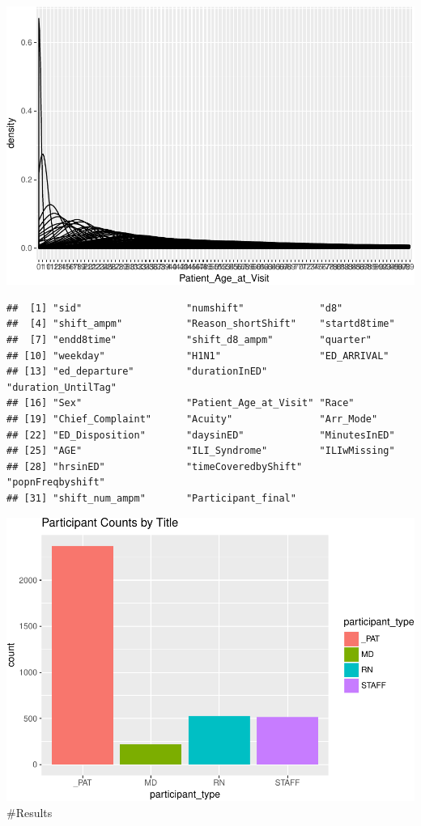 \documentclass[]{elsarticle} %
\makeatletter
\def\maxwidth{\ifdim\Gin@nat@width>\linewidth\linewidth
\else\Gin@nat@width\fi}
\let\Oldincludegraphics\includegraphics
\renewcommand{\includegraphics}[1]{\Oldincludegraphics[width=\maxwidth]{#1}}
\makeatother
\begin{document}
\includegraphics{Flynn_Project_files/figure-latex/assign datasets-2.pdf}

\begin{verbatim}
##  [1] "sid"                  "numshift"             "d8"                  
##  [4] "shift_ampm"           "Reason_shortShift"    "startd8time"         
##  [7] "endd8time"            "shift_d8_ampm"        "quarter"             
## [10] "weekday"              "H1N1"                 "ED_ARRIVAL"          
## [13] "ed_departure"         "durationInED"         "duration_UntilTag"   
## [16] "Sex"                  "Patient_Age_at_Visit" "Race"                
## [19] "Chief_Complaint"      "Acuity"               "Arr_Mode"            
## [22] "ED_Disposition"       "daysinED"             "MinutesInED"         
## [25] "AGE"                  "ILI_Syndrome"         "ILIwMissing"         
## [28] "hrsinED"              "timeCoveredbyShift"   "popnFreqbyshift"     
## [31] "shift_num_ampm"       "Participant_final"
\end{verbatim}

\includegraphics{Flynn_Project_files/figure-latex/assign datasets-3.pdf}
\#Results
\end{document}
